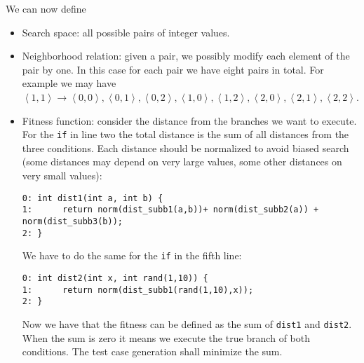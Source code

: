 \begin{enumerate}
        We can now define
        \begin{itemize}
            \item Search space: all possible pairs of integer values. 
            \item Neighborhood relation: given a pair, we possibly modify each element of the pair by one.
                In this case for each pair we have eight pairs in total. 
                For example we may have $\left\langle 1,1 \right\rangle \rightarrow \left\langle 0,0 \right\rangle, \left\langle 0,1 \right\rangle, \left\langle 0,2 \right\rangle, \left\langle 1,0 \right\rangle, \left\langle 1,2 \right\rangle, \left\langle 2,0 \right\rangle, \left\langle 2,1 \right\rangle, \left\langle 2,2 \right\rangle$.
            \item Fitness function: consider the distance from the branches we want to execute. 
                For the \texttt{if} in line two the total distance is the sum of all distances from the three conditions. 
                Each distance should be normalized to avoid biased search (some distances may depend on very large values, some other distances on very small values): 
                \begin{lstlisting}[style=C]
0: int dist1(int a, int b) {
1:      return norm(dist_subb1(a,b))+ norm(dist_subb2(a)) + norm(dist_subb3(b));
2: }
                \end{lstlisting}
                We have to do the same for the \texttt{if} in the fifth line: 
                \begin{lstlisting}[style=C]
0: int dist2(int x, int rand(1,10)) { 
1:      return norm(dist_subb1(rand(1,10),x)); 
2: }
                \end{lstlisting}
                Now we have that the fitness can be defined as the sum of \texttt{dist1} and \texttt{dist2}. 
                When the sum is zero it means we execute the true branch of both conditions. 
                The test case generation shall minimize the sum. 
        \end{itemize}
\end{enumerate}